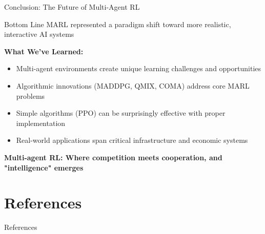 \documentclass[aspectratio=169]{beamer}
\begin{document}
\begin{frame}{Conclusion: The Future of Multi-Agent RL}
    
    \begin{block}{Bottom Line}
        MARL represented a paradigm shift toward more realistic, interactive AI systems
    \end{block}
    
    \vfill
    
    \textbf{What We've Learned:}
    \begin{itemize}
        \item Multi-agent environments create unique learning challenges and opportunities
        \item Algorithmic innovations (MADDPG, QMIX, COMA) address core MARL problems
        \item Simple algorithms (PPO) can be surprisingly effective with proper implementation
        \item Real-world applications span critical infrastructure and economic systems
    \end{itemize}
    
    \vfill
    
    \begin{center}
        \textbf{Multi-agent RL: Where competition meets cooperation, and "intelligence" emerges}
    \end{center}
\end{frame}

\section{References}

\begin{frame}[allowframebreaks]{References}
    \printbibliography[heading=none]
\end{frame}
\end{document}
